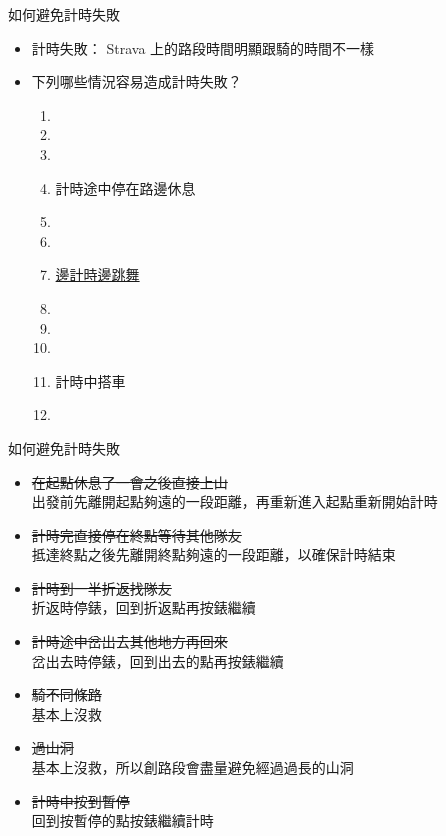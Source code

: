 \begin{frame}[fragile]{如何避免計時失敗}
\begin{itemize}
\item 計時失敗： Strava 上的路段時間明顯跟騎的時間不一樣
\item 下列哪些情況容易造成計時失敗？
\begin{enumerate}[A]
\item {}
\item {}
\item {}
\item 計時途中停在路邊休息
\item {}
\item {}
\item \href{https://www.instagram.com/reel/C5tCGSeyQNI/?utm_source=ig_web_button_share_sheet}{邊計時邊跳舞}
\item {}
\item {}
\item {}
\item 計時中搭車
\item {}
\end{enumerate}
\end{itemize}
\end{frame}

\begin{frame}{如何避免計時失敗}
\begin{itemize}
\item \sout{在起點休息了一會之後直接上山}\\
出發前先離開起點夠遠的一段距離，再重新進入起點重新開始計時
\item \sout{計時完直接停在終點等待其他隊友}\\
抵達終點之後先離開終點夠遠的一段距離，以確保計時結束
\item \sout{計時到一半折返找隊友}\\
折返時停錶，回到折返點再按錶繼續
\item \sout{計時途中岔出去其他地方再回來}\\
岔出去時停錶，回到出去的點再按錶繼續
\item \sout{騎不同條路}\\
基本上沒救
\item \sout{過山洞}\\
基本上沒救，所以創路段會盡量避免經過過長的山洞
\item \sout{計時中按到暫停}\\
回到按暫停的點按錶繼續計時
\end{itemize}
\end{frame}

